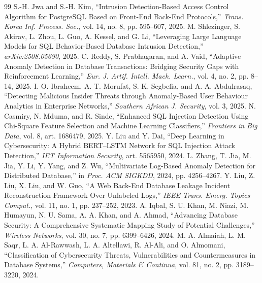 \documentclass[conference]{IEEEtran}
\begin{document}
\begin{thebibliography}{99}
 S.-H. Jwa and S.-H. Kim, ``Intrusion Detection-Based Access Control Algorithm for PostgreSQL Based on Front-End Back-End Protocols,'' \emph{Trans. Korea Inf. Process. Soc.}, vol. 14, no. 8, pp. 595--607, 2025.
 M. Shlezinger, S. Akirav, L. Zhou, L. Guo, A. Kessel, and G. Li, ``Leveraging Large Language Models for SQL Behavior-Based Database Intrusion Detection,'' \emph{arXiv:2508.05690}, 2025.
 C. Reddy, S. Prabhagaran, and A. Vaid, ``Adaptive Anomaly Detection in Database Transactions: Bridging Security Gaps with Reinforcement Learning,'' \emph{Eur. J. Artif. Intell. Mach. Learn.}, vol. 4, no. 2, pp. 8--14, 2025.
 I. O. Ibraheem, A. T. Morufat, S. K. Segbefia, and A. A. Abdulrasaq, ``Detecting Malicious Insider Threats through Anomaly-Based User Behaviour Analytics in Enterprise Networks,'' \emph{Southern African J. Security}, vol. 3, 2025.
 N. Casmiry, N. Mduma, and R. Sinde, ``Enhanced SQL Injection Detection Using Chi-Square Feature Selection and Machine Learning Classifiers,'' \emph{Frontiers in Big Data}, vol. 8, art. 1686479, 2025.
 Y. Liu and Y. Dai, ``Deep Learning in Cybersecurity: A Hybrid BERT--LSTM Network for SQL Injection Attack Detection,'' \emph{IET Information Security}, art. 5565950, 2024.
 L. Zhang, T. Jia, M. Jia, Y. Li, Y. Yang, and Z. Wu, ``Multivariate Log-Based Anomaly Detection for Distributed Database,'' in \emph{Proc. ACM SIGKDD}, 2024, pp. 4256--4267.
 Y. Liu, Z. Liu, X. Liu, and W. Guo, ``A Web Back-End Database Leakage Incident Reconstruction Framework Over Unlabeled Logs,'' \emph{IEEE Trans. Emerg. Topics Comput.}, vol. 11, no. 1, pp. 237--252, 2023.
 A. Iqbal, S. U. Khan, M. Niazi, M. Humayun, N. U. Sama, A. A. Khan, and A. Ahmad, ``Advancing Database Security: A Comprehensive Systematic Mapping Study of Potential Challenges,'' \emph{Wireless Networks}, vol. 30, no. 7, pp. 6399--6426, 2024.
 M. A. Almaiah, L. M. Saqr, L. A. Al-Rawwash, L. A. Altellawi, R. Al-Ali, and O. Almomani, ``Classification of Cybersecurity Threats, Vulnerabilities and Countermeasures in Database Systems,'' \emph{Computers, Materials \& Continua}, vol. 81, no. 2, pp. 3189--3220, 2024.


\end{thebibliography}
\end{document}
